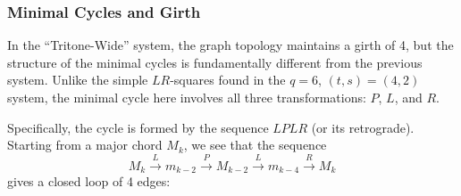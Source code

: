 \documentclass[12pt,letterpaper]{amsart}
\begin{document}
\subsubsection{Minimal Cycles and Girth}
In the ``Tritone-Wide'' system, the graph topology maintains a girth of 4, but the structure of the minimal cycles is fundamentally different from the previous system. Unlike the simple $LR$-squares found in the $q=6$, $(t,s)=(4,2)$ system, the minimal cycle here involves all three transformations: $P$, $L$, and $R$.

Specifically, the cycle is formed by the sequence $LPLR$ (or its retrograde). Starting from a major chord $M_k$, we see that the sequence 
\[
M_k \xrightarrow{L} m_{k-2} \xrightarrow{P} M_{k-2} \xrightarrow{L} m_{k-4} \xrightarrow{R} M_k
\]
gives a closed loop of 4 edges:
\end{document}
